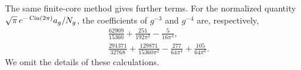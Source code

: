 \begin{samepage}
\begin{rmk}\label{rmk:s04:further-coefficients}
The same finite-core method gives further terms. For the normalized
quantity $\sqrt\pi\,e^{-\operatorname{\mathrm{Cin}}(2\pi)}a_g/N_g$, the coefficients of
$g^{-3}$ and $g^{-4}$ are, respectively,
\begin{gather*}
 \frac{62909}{15360}+\frac{251}{192\pi^2}-\frac5{16\pi^4},\\
 \frac{291371}{32768}+\frac{129871}{15360\pi^2}
                    -\frac{277}{64\pi^4}+\frac{105}{64\pi^6}.
\end{gather*}
We omit the details of these calculations.
\end{rmk}
\end{samepage}
